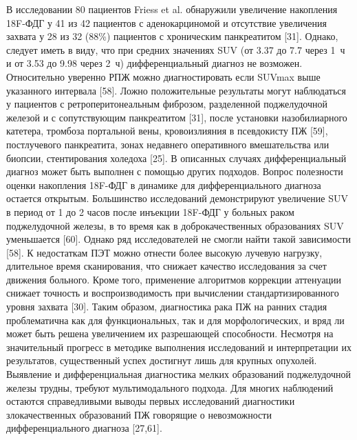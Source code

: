 В исследовании 80 пациентов Friess et al. обнаружили увеличение накопления 18F-ФДГ у 41 из 42 пациентов с аденокарциномой и отсутствие увеличения захвата у 28 из 32 (88\%) пациентов с хроническим панкреатитом [31]. Однако, следует иметь в виду, что при средних значениях SUV (от 3.37 до 7.7 через 1~ч и от 3.53 до 9.98 через 2~ч) дифференциальный диагноз не возможен. Относительно уверенно РПЖ можно диагностировать если SUVmax выше указанного интервала [58].
Ложно положительные результаты могут наблюдаться у пациентов с ретроперитонеальным фиброзом, разделенной поджелудочной железой и с сопутствующим панкреатитом [31], после установки назобилиарного катетера, тромбоза портальной вены, кровоизлияния в псевдокисту ПЖ [59], постлучевого панкреатита, зонах недавнего оперативного вмешательства или биопсии, стентирования холедоха [25]. В описанных случаях дифференциальный диагноз может быть выполнен с помощью других подходов. 
Вопрос полезности оценки накопления 18F-ФДГ в динамике для дифференциального диагноза остается открытым. Большинство исследований демонстрируют увеличение SUV в период от 1 до 2 часов после инъекции 18F-ФДГ у больных раком поджелудочной железы, в то время как в доброкачественных образованиях SUV уменьшается [60]. Однако ряд исследователей не смогли найти такой зависимости [58].
К недостаткам ПЭТ можно отнести более высокую лучевую нагрузку, длительное время сканирования, что снижает качество исследования за счет движения больного. Кроме того, применение алгоритмов коррекции аттенуации снижает точность и воспроизводимость при вычислении стандартизированного уровня захвата [30].
Таким образом, диагностика рака ПЖ на ранних стадия проблематична как для функциональных, так и для морфологических, и вряд ли может быть решена увеличением их разрешающей способности. 
Несмотря на значительный прогресс в методике выполнения исследований и интерпретации их результатов, существенный успех достигнут лишь для крупных опухолей. Выявление и дифференциальная диагностика мелких образований поджелудочной железы трудны, требуют мультимодального подхода. Для многих наблюдений остаются справедливыми выводы первых исследований диагностики злокачественных образований ПЖ говорящие о невозможности дифференциального диагноза [27,61].

